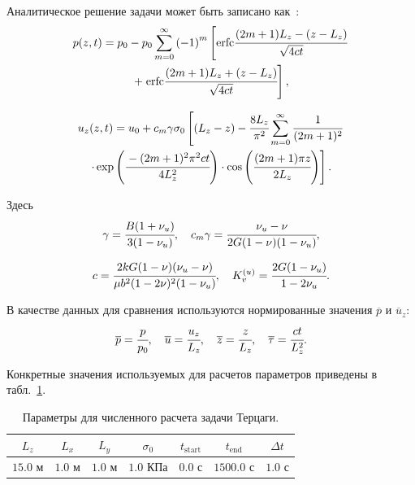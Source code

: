 Аналитическое решение задачи может быть записано как~\cite{wang_2000}:
\begin{multline}
\label{eq:Pter}
%
p(z,t) = p_0 - p_0 \sum \limits_{m=0}^{\infty} \left(-1\right)^m
%
\left[   
\text{erfc} \cfrac{(2m+1)L_z - (z-L_z)}{\sqrt{4ct}} \right. \\ \left. + \; \text{erfc} \cfrac{(2m+1)L_z+(z-L_z)}{\sqrt{4ct}}
\right],
%
\end{multline}

\begin{multline}
\label{eq:Uter}
%
u_z(z,t)= u_0 + c_m\gamma\sigma_0 
%
\left[
(L_z-z) - \cfrac{8L_z}{\pi^2} \sum \limits_{m=0}^{\infty} \cfrac{1}{(2m+1)^2} \right. \\
\left. \cdot \exp \left( \cfrac{-(2m+1)^2\pi^2 c t}{4L_z^2}  \right) 
\cdot \cos \left( \cfrac{(2m+1)\pi z}{2 L_z}  \right)
\right].
%
\end{multline}

Здесь
%
\begin{gather*}
%
\gamma = \cfrac{B(1+\nu_u)}{3(1-\nu_u)}, \quad
c_m\gamma = \cfrac{\nu_u-\nu}{2G(1-\nu)(1-\nu_u)}, \\[7pt]
%
c = \cfrac{2kG(1-\nu)(\nu_u-\nu)}{\mu b^2 (1-2\nu)^2(1-\nu_u)}, \quad K_v^{(u)} = \cfrac{2G(1-\nu_u)}{1-2\nu_u}.
%
\end{gather*}
%

В качестве данных для сравнения используются нормированные значения $\overline{p}$ и
$\overline{u}_z$:
%
\begin{equation*}
%
\overline{p} = \cfrac{p}{p_0}, \quad \overline{u} = \cfrac{u_z}{L_z}, \quad 
\overline{z} = \cfrac{z}{L_z}, \quad \overline{\tau} = \cfrac{ct}{L_z^2}.
%
\end{equation*}
%

Конкретные значения используемых для расчетов параметров приведены в табл.~\ref{tab:terzaghi}.
%
\begin{table}[h!]
\centering
%
\renewcommand{\arraystretch}{1.5}
\renewcommand{\tabcolsep}{6 pt} 
\begin{tabular}{|c|c|c|c|c|c|c|}
\hline
$L_z$ & $L_x$ & $L_y$ & $\sigma_0$ & $t_{\text{start}}$ & $t_{\text{end}}$ & $\Delta t$\\
\hline
 $15.0$ м & $1.0$ м & $1.0$ м & $1.0$ КПа & $0.0$ с & $1500.0$ с & $1.0$ с\\
\hline
\end{tabular}
%
\caption{Параметры для численного расчета задачи Терцаги.}\label{tab:terzaghi}
\end{table}
%

